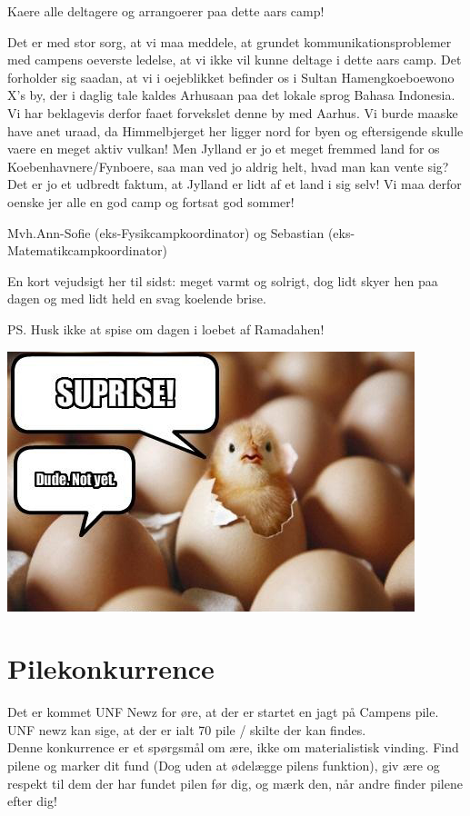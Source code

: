 \begin{minipage}[b]{0.95\linewidth}
\begin{minipage}[t]{0.47\textwidth}
Kaere alle deltagere og arrangoerer paa dette aars camp!

Det er med stor sorg, at vi maa meddele, at grundet kommunikationsproblemer med campens oeverste ledelse, at vi ikke vil kunne deltage i dette aars camp. 
Det forholder sig saadan, at vi i oejeblikket befinder os i Sultan Hamengkoeboewono X's by, der i daglig tale kaldes Arhusaan paa det lokale sprog Bahasa Indonesia. 
Vi har beklagevis derfor faaet forvekslet denne by med Aarhus. Vi burde maaske have anet uraad, da Himmelbjerget her ligger nord for byen og eftersigende skulle vaere en meget aktiv vulkan! Men Jylland er jo et meget fremmed land for os Koebenhavnere/Fynboere, saa man ved jo aldrig helt, hvad man kan vente sig? Det er jo et udbredt faktum, at Jylland er lidt af et land i sig selv!
Vi maa derfor oenske jer alle en god camp og fortsat god sommer!

Mvh.Ann-Sofie (eks-Fysikcampkoordinator) og Sebastian (eks-Matematikcampkoordinator)

En kort vejudsigt her til sidst: meget varmt og solrigt, dog lidt skyer hen paa dagen og med lidt held en svag koelende brise.

PS. Husk ikke at spise om dagen i loebet af Ramadahen!

\vspace{2mm}

\includegraphics[width=\linewidth]{suprise.jpg}

\vspace{-4mm}
\section*{Pilekonkurrence}
Det er kommet UNF Newz for øre, at der er startet en jagt på Campens pile. UNF newz kan sige, at der er ialt 70 pile / skilte der kan findes. \\
Denne konkurrence er et spørgsmål om ære, ikke om materialistisk vinding. Find pilene og marker dit fund (Dog uden at ødelægge pilens funktion), giv ære og respekt til dem der har fundet pilen før dig, og mærk den, når andre finder pilene efter dig!

\end{minipage}
\end{minipage}
